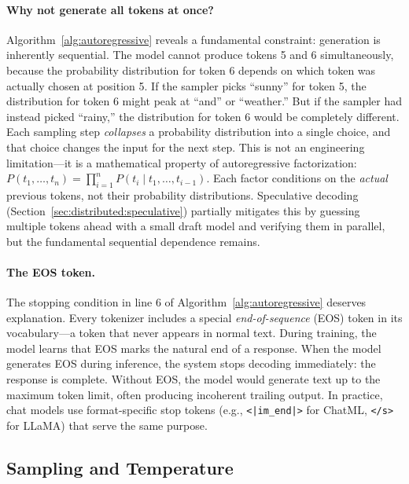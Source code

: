 \paragraph{Why not generate all tokens at once?} Algorithm~\ref{alg:autoregressive} reveals a fundamental constraint: generation is inherently sequential. The model cannot produce tokens 5 and 6 simultaneously, because the probability distribution for token 6 depends on which token was actually chosen at position 5. If the sampler picks ``sunny'' for token 5, the distribution for token 6 might peak at ``and'' or ``weather.'' But if the sampler had instead picked ``rainy,'' the distribution for token 6 would be completely different. Each sampling step \emph{collapses} a probability distribution into a single choice, and that choice changes the input for the next step. This is not an engineering limitation---it is a mathematical property of autoregressive factorization: $P(t_1, \ldots, t_n) = \prod_{i=1}^{n} P(t_i \mid t_1, \ldots, t_{i-1})$. Each factor conditions on the \emph{actual} previous tokens, not their probability distributions. Speculative decoding (Section~\ref{sec:distributed:speculative}) partially mitigates this by guessing multiple tokens ahead with a small draft model and verifying them in parallel, but the fundamental sequential dependence remains.

%
\paragraph{The EOS token.} The stopping condition in line 6 of Algorithm~\ref{alg:autoregressive} deserves explanation. Every tokenizer includes a special \emph{end-of-sequence} (EOS) token in its vocabulary---a token that never appears in normal text. During training, the model learns that EOS marks the natural end of a response. When the model generates EOS during inference, the system stops decoding immediately: the response is complete. Without EOS, the model would generate text up to the maximum token limit, often producing incoherent trailing output. In practice, chat models use format-specific stop tokens (e.g., \texttt{<|im\_end|>} for ChatML, \texttt{</s>} for LLaMA) that serve the same purpose.

\subsection{Sampling and Temperature}
\label{sec:sampling}

